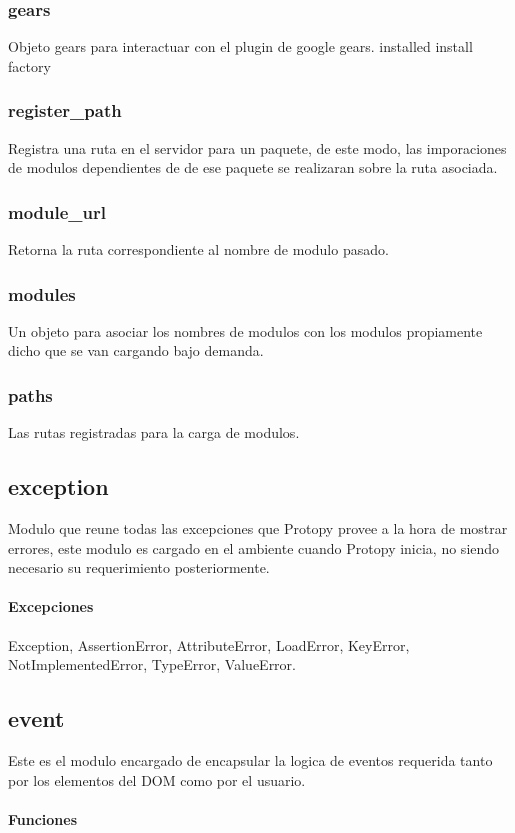 \subsubsection*{gears}
Objeto gears para interactuar con el plugin de google gears.
installed
install
factory
\subsubsection*{register\_path}
Registra una ruta en el servidor para un paquete, de este modo, las imporaciones
de modulos dependientes de de ese paquete se realizaran sobre la ruta asociada. 
\subsubsection*{module\_url}
Retorna la ruta correspondiente al nombre de modulo pasado.
\subsubsection*{modules}
Un objeto para asociar los nombres de modulos con los modulos propiamente dicho
que se van cargando bajo demanda.
\subsubsection*{paths}
Las rutas registradas para la carga de modulos.

\subsection{exception}
Modulo que reune todas las excepciones que Protopy provee a la hora de mostrar
errores, este modulo es cargado en el ambiente cuando Protopy inicia, no siendo
necesario su requerimiento posteriormente.

\paragraph{Excepciones}
Exception, AssertionError, AttributeError, LoadError, KeyError,
NotImplementedError, TypeError, ValueError.

\subsection{event}
Este es el modulo encargado de encapsular la logica de eventos requerida tanto
por los elementos del DOM como por el usuario.

\paragraph{Funciones}
